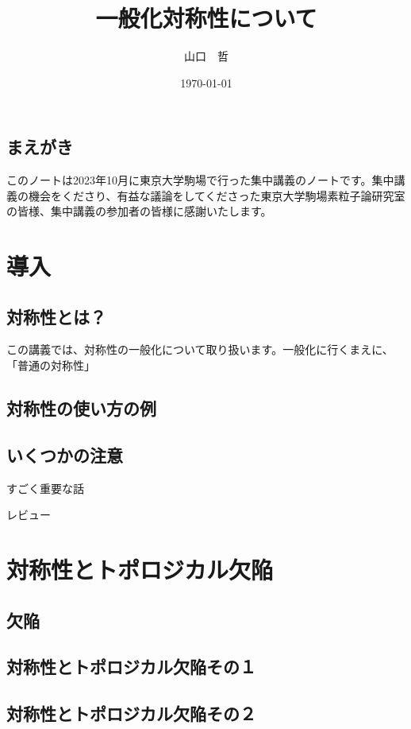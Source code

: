 \documentclass[report,paper=a4, fontsize=12pt, line_length=16cm, number_of_lines=33,dvipdfmx]{jlreq}
\title{一般化対称性について}
\author{山口　哲}
\date{\today}
\numberwithin{equation}{chapter}
\begin{document}
\maketitle
\tableofcontents

\section*{まえがき}

このノートは2023年10月に東京大学駒場で行った集中講義のノートです。集中講義の機会をくださり、有益な議論をしてくださった東京大学駒場素粒子論研究室の皆様、集中講義の参加者の皆様に感謝いたします。

\chapter{導入}
\section{対称性とは？}

この講義では、対称性の一般化について取り扱います。一般化に行くまえに、「普通の対称性」


\section{対称性の使い方の例}
\section{いくつかの注意}

\begin{emphasize}[重要]
  すごく重要な話
\end{emphasize}

レビュー\cite{Shao:2023gho}

\chapter{対称性とトポロジカル欠陥}
\section{欠陥}
\section{対称性とトポロジカル欠陥その１}
\section{対称性とトポロジカル欠陥その２}
\end{document}
